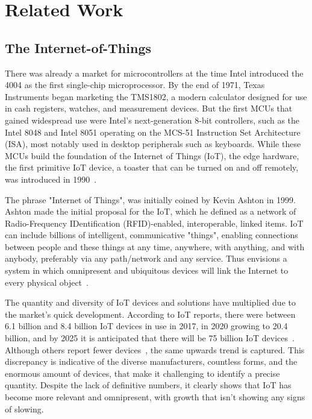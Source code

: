\chapter{Related Work}

\section{The Internet-of-Things}

There was already a market for microcontrollers at the time Intel introduced the 4004 as the first single-chip microprocessor. By the end of 1971, Texas Instruments began marketing the TMS1802, a modern calculator designed for use in cash registers, watches, and measurement devices. But the first MCUs that gained widespread use were Intel's next-generation 8-bit controllers, such as the Intel 8048 and Intel 8051 operating on the MCS-51 Instruction Set Architecture (ISA), most notably used in desktop peripherals such as keyboards. While these MCUs build the foundation of the Internet of Things (IoT), the edge hardware, the first primitive IoT device, a toaster that can be turned on and off remotely, was introduced in 1990~\cite{7786805}.

The phrase "Internet of Things", was initially coined by Kevin Ashton in 1999. Ashton made the initial proposal for the IoT, which he defined as a network of Radio-Frequency IDentification (RFID)-enabled, interoperable, linked items. IoT can include billions of intelligent, communicative "things", enabling connections between people and these things at any time, anywhere, with anything, and with anybody, preferably via any path/network and any service. Thus envisions a system in which omnipresent and ubiquitous devices will link the Internet to every physical object~\cite{shin2014socio, wang2015introduction}.

The quantity and diversity of IoT devices and solutions have multiplied due to the market's quick development. According to IoT reports, there were between 6.1 billion and 8.4 billion IoT devices in use in 2017, in 2020 growing to 20.4 billion, and by 2025 it is anticipated that there will be 75 billion IoT devices~\cite{iot-size1, iot-size2}. Although others report fewer devices~\cite{iot-size}, the same upwards trend is captured. 
This discrepancy is indicative of the diverse manufacturers, countless forms, and the enormous amount of devices, that make it challenging to identify a precise quantity. 
%
Despite the lack of definitive numbers, it clearly shows that IoT has become more relevant and omnipresent, with growth that isn't showing any signs of slowing.

